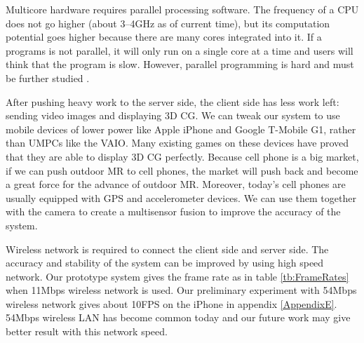 Multicore hardware requires parallel processing software. The frequency of a CPU does not go higher (about 3--4GHz as of current time), but its computation potential goes higher because there are many cores integrated into it. If a programs is not parallel, it will only run on a single core at a time and users will think that the program is slow. However, parallel programming is hard and must be further studied \cite{Reference17}.

After pushing heavy work to the server side, the client side has less work left: sending video images and displaying 3D CG. We can tweak our system to use mobile devices of lower power like Apple iPhone and Google T-Mobile G1, rather than UMPCs like the VAIO. Many existing games on these devices have proved that they are able to display 3D CG perfectly. Because cell phone is a big market, if we can push outdoor MR to cell phones, the market will push back and become a great force for the advance of outdoor MR. Moreover, today's cell phones are usually equipped with GPS and accelerometer devices. We can use them together with the camera to create a multisensor fusion \cite{Reference14} to improve the accuracy of the system.

Wireless network is required to connect the client side and server side. The accuracy and stability of the system can be improved by using high speed network. Our prototype system gives the frame rate as in table \ref{tb:FrameRates} when 11Mbps wireless network is used. Our preliminary experiment with 54Mbps wireless network gives about 10FPS on the iPhone in appendix \ref{AppendixE}. 54Mbps wireless LAN has become common today and our future work may give better result with this network speed.
